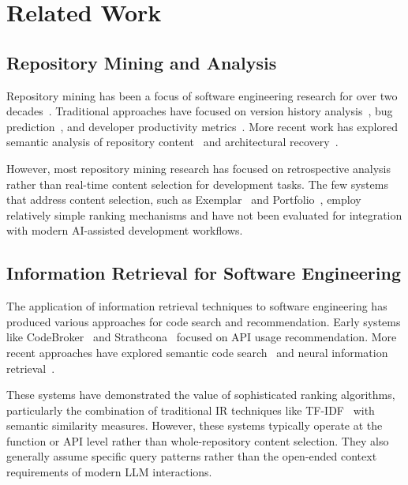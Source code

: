 \documentclass[conference]{IEEEtran}
\begin{document}
\section{Related Work}

\subsection{Repository Mining and Analysis}

Repository mining has been a focus of software engineering research for over two decades~\cite{kagdi2007survey}. Traditional approaches have focused on version history analysis~\cite{hassan2008road}, bug prediction~\cite{d2010extensive}, and developer productivity metrics~\cite{mockus2002two}. More recent work has explored semantic analysis of repository content~\cite{bavota2013methodbook} and architectural recovery~\cite{ducasse2009software}.

However, most repository mining research has focused on retrospective analysis rather than real-time content selection for development tasks. The few systems that address content selection, such as Exemplar~\cite{zhang2012exemplar} and Portfolio~\cite{mcmillan2011portfolio}, employ relatively simple ranking mechanisms and have not been evaluated for integration with modern AI-assisted development workflows.

\subsection{Information Retrieval for Software Engineering}

The application of information retrieval techniques to software engineering has produced various approaches for code search and recommendation. Early systems like CodeBroker~\cite{ye2001codebroker} and Strathcona~\cite{holmes2006strathcona} focused on API usage recommendation. More recent approaches have explored semantic code search~\cite{lv2015codehow} and neural information retrieval~\cite{gu2016deep}.

These systems have demonstrated the value of sophisticated ranking algorithms, particularly the combination of traditional IR techniques like TF-IDF~\cite{robertson2009probabilistic} with semantic similarity measures. However, these systems typically operate at the function or API level rather than whole-repository content selection. They also generally assume specific query patterns rather than the open-ended context requirements of modern LLM interactions.
\end{document}
